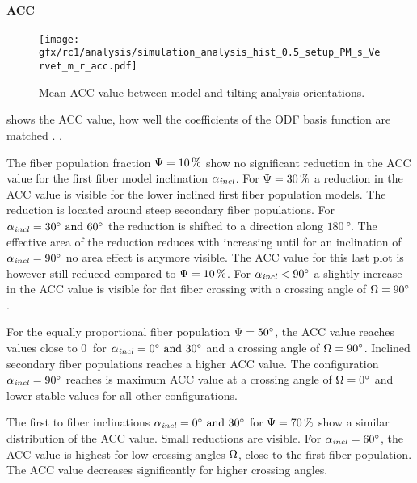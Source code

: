 \paragraph{\acs{ACC}}
%
\begin{figure}[!p]
\centering
\texttt{[image: gfx/rc1/analysis/simulation\_analysis\_hist\_0.5\_setup\_PM\_s\_Vervet\_m\_r\_acc.pdf]}
\caption{Mean \ac{ACC} value between model and tilting analysis orientations. }
\label{fig:sim_ana_acc}
\end{figure}
% 
 shows the  \ac{ACC} value, \ie{} how well the coefficients of the \ac{ODF} basis function are matched \cite{Schilling2018}.
.
\par
% 
The fiber population fraction $\textnormal{$\Psi$}=\SI{10}{\percent}$ show no significant reduction in the \ac{ACC} value for the first fiber model inclination $\textnormal{$\alpha_{\mathit{incl}}$}$.
For $\textnormal{$\Psi$}=\SI{30}{\percent}$ a reduction in the \ac{ACC} value is visible for the lower inclined first fiber population models.
The reduction is located around steep secondary fiber populations.
For $\modelInc = \SIlist{30;60}{\degree}$ the reduction is shifted to a direction along $\SI{180}{\degree}$.
The effective area of the reduction reduces with increasing \modelInc{} until for an inclination of $\textnormal{$\alpha_{\mathit{incl}}$}=\SI{90}{\degree}$ no area effect is anymore visible.
The \ac{ACC} value for this last plot is however still reduced compared to $\textnormal{$\Psi$}=\SI{10}{\percent}$.
For $\textnormal{$\alpha_{\mathit{incl}}$} < \SI{90}{\degree}$ a slightly increase in the \ac{ACC} value is visible for flat fiber crossing with a crossing angle of $\textnormal{$\Omega$}=\SI{90}{\degree}$.
\par
%
For the equally proportional fiber population $\textnormal{$\Psi$} = \SI{50}{\degree}$, the \ac{ACC} value reaches values close to $\SI{0}{}$ for $\modelInc = \SIlist{0;30}{\degree}$ and a crossing angle of $\textnormal{$\Omega$}=\SI{90}{\degree}$.
Inclined secondary fiber populations reaches a higher \ac{ACC} value.
The configuration $\textnormal{$\alpha_{\mathit{incl}}$} = \SI{90}{\degree}$ reaches is maximum \ac{ACC} value at a crossing angle of $\textnormal{$\Omega$}=\SI{0}{\degree}$ and lower stable values for all other configurations.
\par
%
The first to fiber inclinations $\modelInc = \SIlist{0;30}{\degree}$ for $\textnormal{$\Psi$}=\SI{70}{\percent}$ show a similar distribution of the \ac{ACC} value. 
Small reductions are visible.
For $\textnormal{$\alpha_{\mathit{incl}}$}=\SI{60}{\degree}$, the \ac{ACC} value is highest for low crossing angles $\textnormal{$\Omega$}$, \ie{} close to the first fiber population.
The \ac{ACC} value decreases significantly for higher crossing angles.
